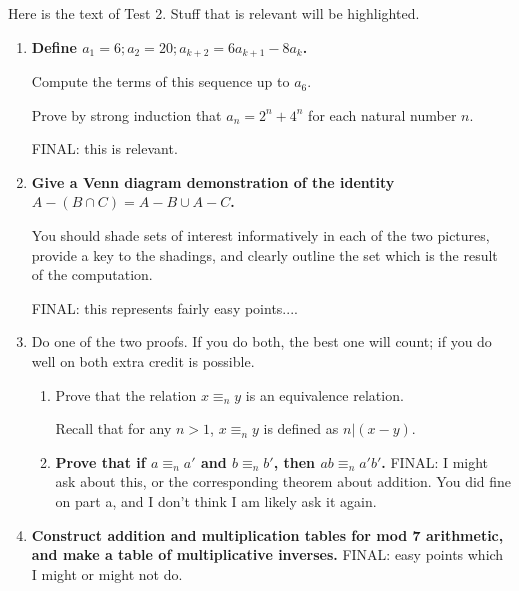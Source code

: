 \documentclass[12pt]{article}
\begin{document}
Here is the text of Test 2.  Stuff that is relevant will be highlighted.

\begin{enumerate}



\item  {\bf Define $a_1 = 6; a_2 = 20; a_{k+2} = 6a_{k+1}-8a_k$.

Compute the terms of this sequence up to $a_6$.

Prove by strong induction that $a_n = 2^n + 4^n$ for each natural number $n$.}
FINAL:  this is relevant.

\newpage

\item 

{\bf Give a Venn diagram demonstration of the identity $A - (B \cap C) = A-B \cup A-C$.

You should shade sets of interest informatively in each of the two pictures, provide a key to the shadings, and clearly outline the set which is the result of the computation.}
FINAL:  this represents fairly easy points....

\newpage





\item  Do one of the two proofs.  If you do both, the best one will count;  if you do well on both extra credit is possible.

\begin{enumerate}

\item Prove that the relation $x \equiv_n y$ is an equivalence relation.

Recall that for any $n>1$, $x \equiv_n y$ is defined as $n|(x-y)$.

\newpage

\item {\bf Prove that if $a \equiv_n a'$ and $b \equiv_n b'$, then $ab \equiv_n a'b'$.}  FINAL:  I might ask about this, or the corresponding theorem about addition.  You did fine on part a, and I don't think I am likely ask it again.

\end{enumerate}

\newpage

\item   {\bf Construct addition and multiplication tables for mod 7 arithmetic, and make a table of multiplicative inverses.}
FINAL:  easy points which I might or might not do.


\end{enumerate}
\end{document}
